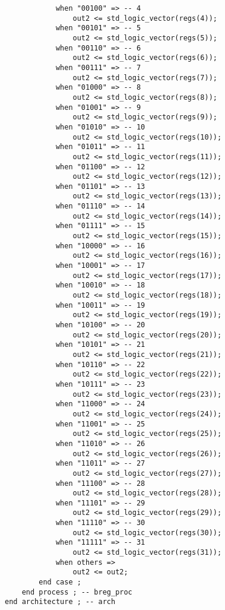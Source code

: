 \documentclass[a4paper]{article}
\begin{document}
\begin{lstlisting}
            when "00100" => -- 4
                out2 <= std_logic_vector(regs(4));
            when "00101" => -- 5
                out2 <= std_logic_vector(regs(5));
            when "00110" => -- 6
                out2 <= std_logic_vector(regs(6));
            when "00111" => -- 7
                out2 <= std_logic_vector(regs(7));
            when "01000" => -- 8
                out2 <= std_logic_vector(regs(8));
            when "01001" => -- 9
                out2 <= std_logic_vector(regs(9));
            when "01010" => -- 10
                out2 <= std_logic_vector(regs(10));
            when "01011" => -- 11
                out2 <= std_logic_vector(regs(11));
            when "01100" => -- 12
                out2 <= std_logic_vector(regs(12));
            when "01101" => -- 13
                out2 <= std_logic_vector(regs(13));
            when "01110" => -- 14
                out2 <= std_logic_vector(regs(14));
            when "01111" => -- 15
                out2 <= std_logic_vector(regs(15));
            when "10000" => -- 16
                out2 <= std_logic_vector(regs(16));
            when "10001" => -- 17
                out2 <= std_logic_vector(regs(17));
            when "10010" => -- 18
                out2 <= std_logic_vector(regs(18));
            when "10011" => -- 19
                out2 <= std_logic_vector(regs(19));
            when "10100" => -- 20
                out2 <= std_logic_vector(regs(20));
            when "10101" => -- 21
                out2 <= std_logic_vector(regs(21));
            when "10110" => -- 22
                out2 <= std_logic_vector(regs(22));
            when "10111" => -- 23
                out2 <= std_logic_vector(regs(23));
            when "11000" => -- 24
                out2 <= std_logic_vector(regs(24));
            when "11001" => -- 25
                out2 <= std_logic_vector(regs(25));
            when "11010" => -- 26
                out2 <= std_logic_vector(regs(26));
            when "11011" => -- 27
                out2 <= std_logic_vector(regs(27));
            when "11100" => -- 28
                out2 <= std_logic_vector(regs(28));
            when "11101" => -- 29
                out2 <= std_logic_vector(regs(29));
            when "11110" => -- 30
                out2 <= std_logic_vector(regs(30));
            when "11111" => -- 31
                out2 <= std_logic_vector(regs(31));
            when others =>
                out2 <= out2;
        end case ;
    end process ; -- breg_proc
end architecture ; -- arch
\end{lstlisting}
\end{document}
